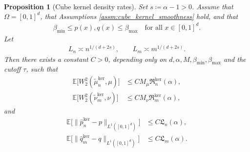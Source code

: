 \documentclass[11pt,reqno]{amsart}
\newtheorem{proposition}[theorem]{Proposition}
\theoremstyle{definition}
\renewcommand{\hat}{\widehat}
\renewcommand{\tilde}{\widetilde}
\newcommand{\Ep}{\mathbb{E}}
\begin{document}
\begin{proposition}[Cube kernel density rates]
\label{prop:cube_kernel_density_rates}
Set $s\coloneqq \alpha-1>0$.
Assume that $\Omega=[0,1]^d$, that  Assumptions \ref{assm:cube_kernel_smoothness} hold, and that
\begin{align*}
    \beta_{\min} \le p(x),q(x) \le \beta_{\max}
    \quad \text{for all } x\in[0,1]^d.
\end{align*}
Let
\begin{align}
    L_n \asymp n^{1/(d+2s)},
    \qquad
    L_m \asymp m^{1/(d+2s)}.
\end{align}
Then there exists a constant $C>0$, depending only on $d,\alpha,M,\beta_{\min},\beta_{\max}$ and the cutoff $\tau$, such that
\begin{align}
\label{eq:cube_kernel_density_rate_source_w2}
    \Ep\bigl[W_2^2(\tilde\mu_n^{\mathrm{ker}},\mu)\bigr]
    &\le
    C M_\mu\mathfrak R_n^{\mathrm{ker}}(\alpha),
    \\
\label{eq:cube_kernel_density_rate_target_w2}
    \Ep\bigl[W_2^2(\tilde\nu_m^{\mathrm{ker}},\nu)\bigr]
    &\le
    C M_\nu\mathfrak R_m^{\mathrm{ker}}(\alpha),
\end{align}
and
\begin{align}
\label{eq:cube_kernel_density_rate_source_l1}
    \Ep\bigl[\|\hat p_n^{\mathrm{ker}}-p\|_{L^1([0,1]^d)}\bigr]
    &\le
    C\mathfrak L_n(\alpha),
    \\
\label{eq:cube_kernel_density_rate_target_l1}
    \Ep\bigl[\|\hat q_m^{\mathrm{ker}}-q\|_{L^1([0,1]^d)}\bigr]
    &\le
    C\mathfrak L_m(\alpha).
\end{align}
\end{proposition}
\end{document}

